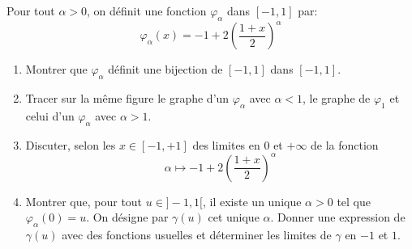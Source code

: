 Pour tout $\alpha > 0$, on définit une fonction $\varphi_\alpha$ dans $[-1,1]$ par:
\begin{displaymath}
  \varphi_\alpha (x) = -1 + 2 \left( \frac{1 + x}{2}\right)^\alpha 
\end{displaymath}
\begin{enumerate}
  \item Montrer que $\varphi_\alpha$ définit une bijection de $[-1,1]$ dans $[-1,1]$.
  \item Tracer sur la même figure le graphe d'un $\varphi_\alpha$ avec $\alpha <1$, le graphe de $\varphi_1$ et celui d'un $\varphi_\alpha$ avec $\alpha >1$.
  \item Discuter, selon les $x\in [-1,+1]$ des limites en $0$ et $+\infty$ de la fonction
\begin{displaymath}
  \alpha \mapsto -1 + 2 \left( \frac{1 + x}{2}\right)^\alpha
\end{displaymath}
  \item Montrer que, pour tout $u\in ]-1, 1[$, il existe un unique $\alpha > 0$ tel que $\varphi_\alpha(0) = u$. On désigne par $\gamma(u)$ cet unique $\alpha$. Donner une expression de $\gamma(u)$ avec des fonctions usuelles et déterminer les limites de $\gamma$ en $-1$ et $1$.
\end{enumerate}
